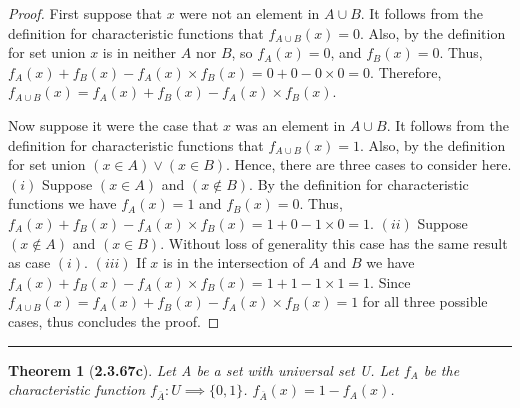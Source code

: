\documentclass[a4paper, 12pt]{article}
\theoremstyle{plain}
\newtheorem*{theorem*}{Theorem}
\begin{document}
\begin{proof}
    First suppose that $x$ were not an element in $A \cup B$. It follows from the definition 
    for characteristic functions that $f_{A \cup B}(x) = 0$. Also, by the definition for set 
    union $x$ is in neither $A$ nor $B$, so $f_{A}(x) = 0$, and $f_{B}(x) = 0$. Thus, 
    $f_{A}(x) + f_{B}(x) - f_{A}(x) \times f_{B}(x) = 0 + 0 - 0 \times 0 = 0$. Therefore, 
    $f_{A \cup B}(x) = f_{A}(x) + f_{B}(x) - f_{A}(x) \times f_{B}(x)$.
    
    Now suppose it were the case that $x$ was an element in $A \cup B$. It follows from the 
    definition for characteristic functions that $f_{A \cup B}(x) = 1$. Also, by the definition 
    for set union $(x \in A) \lor (x \in B)$. Hence, there are three cases to consider here. 
    \newline \newline \indent $(i)$ Suppose $(x \in A)$ and $(x \notin B)$. By the definition 
    for characteristic \indent functions we have $f_{A}(x) = 1$ and $f_{B}(x) = 0$. Thus, 
    \newline \indent $f_{A}(x) + f_{B}(x) - f_{A}(x) \times f_{B}(x) = 1 + 0 - 1 \times 0 = 1$. 
    \newline \newline \indent $(ii)$ Suppose $(x \notin A)$ and $(x \in B)$. Without loss of 
    generality this case \indent has the same result as case $(i)$. \newline \newline \indent 
    $(iii)$ If $x$ is in the intersection of $A$ and $B$ we have \newline \indent 
    $f_{A}(x) + f_{B}(x) - f_{A}(x) \times f_{B}(x) = 1 + 1 - 1 \times 1 = 1$. \newline \newline 
    Since $f_{A \cup B}(x) = f_{A}(x) + f_{B}(x) - f_{A}(x) \times f_{B}(x) = 1$ for all three 
    possible cases, thus concludes the proof.
\end{proof}
\begin{center}
    \rule{5.4in}{1pt}
\end{center}


\begin{theorem*}[\textbf{2.3.67c}]
    Let A be a set with universal set U. Let $f_{A}$ be the \newline characteristic function 
    $f_{\overline{A}}: U \implies \{0, 1\}$. $f_{\overline{A}}(x) = 1 - f_{A}(x)$.
\end{theorem*}
\end{document}
